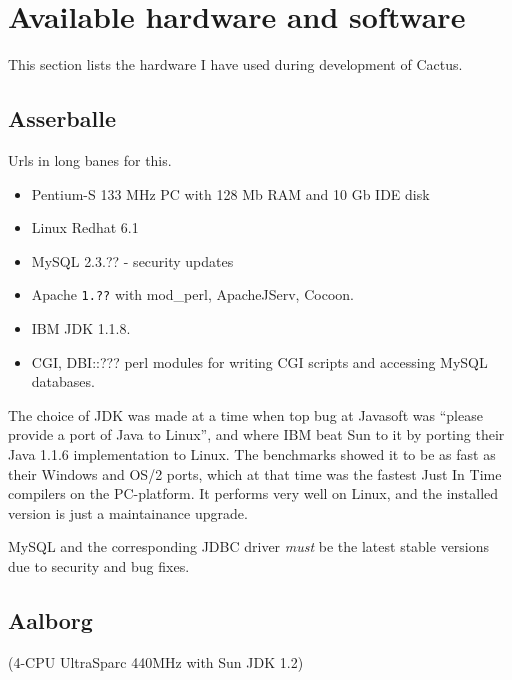 
\section{Available hardware and software}
\label{sec:availabe-hardware-and-software}

This section lists the hardware I have used during development of
Cactus.  


\subsection{Asserballe}
\label{sec:asserballe}

Urls in long banes for this.

\begin{itemize}
\item Pentium-S 133 MHz PC with 128 Mb RAM and 10 Gb IDE disk
\item Linux Redhat 6.1  
\item MySQL \textsf{2.3.?? - security updates}
\item Apache \texttt{1.??} with mod\_perl, ApacheJServ, Cocoon.
\item IBM JDK 1.1.8.
\item CGI, DBI::\textsf{???} perl modules for writing CGI scripts and
  accessing MySQL databases.
\end{itemize}

The choice of JDK was made at a time when \textsf{top bug at Javasoft}
was ``please provide a port of Java to Linux'', and where IBM beat Sun
to it by porting their Java 1.1.6 implementation to Linux.  The
benchmarks showed it to be as fast as their Windows and OS/2 ports,
which at that time was the fastest Just In Time compilers on the
PC-platform.  It performs very well on Linux, and the installed
version is just a maintainance upgrade.

MySQL and the corresponding JDBC driver \textit{must} be the latest
stable versions due to security and bug fixes.



\subsection{Aalborg}
\label{sec:aalborg}


(4-CPU UltraSparc 440MHz with Sun JDK 1.2)



